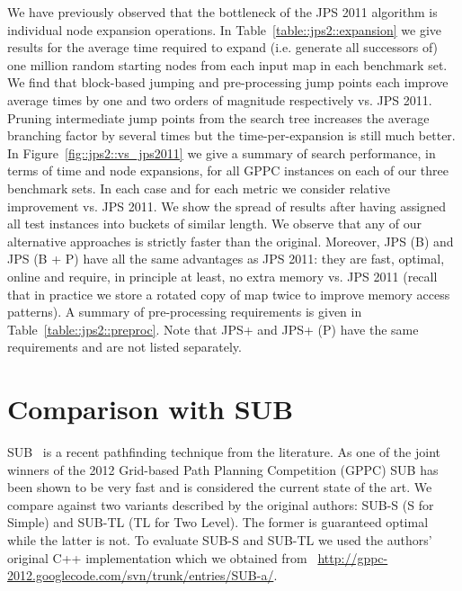 We have previously observed that the bottleneck of the JPS 2011 algorithm is
individual node expansion operations. In Table~\ref{table::jps2::expansion} we
give results for the average time required to expand (i.e. generate all
successors of) one million random starting nodes from each input map in each
benchmark set. We find that block-based jumping and pre-processing jump points
each improve average times by one and two orders of magnitude respectively vs.
JPS 2011.  Pruning intermediate jump points from the search tree increases the
average branching factor by several times but the time-per-expansion is still
much better.  In Figure~\ref{fig::jps2::vs_jps2011} we give a summary of
search performance, in terms of time and node expansions, for all GPPC
instances on each of our three benchmark sets.  In each case and for each
metric we consider relative improvement vs. JPS 2011.  We show the spread of
results after having assigned all test instances into buckets of similar
length.  We observe that any of our alternative approaches is strictly faster
than the original.  Moreover, JPS (B) and JPS (B + P) have all the same
advantages as JPS 2011: they are fast, optimal, online and require, in
principle at least, no extra memory vs. JPS 2011 (recall that in practice we
store a rotated copy of map twice to improve memory access patterns).  A
summary of pre-processing requirements is given in
Table~\ref{table::jps2::preproc}. Note that JPS+ and JPS+ (P) have the same
requirements and are not listed separately.



\section{Comparison with SUB}
SUB~\cite{urasKH13} is a recent pathfinding technique from the literature.
As one of the joint winners of the 2012 Grid-based Path Planning Competition (GPPC) 
SUB has been shown to be very fast and is considered the current state of the art.
We compare against two variants described by the original authors: SUB-S (S
for Simple) and SUB-TL (TL for Two Level). The former is guaranteed optimal
while the latter is not.  To evaluate SUB-S and SUB-TL we used the authors'
original C++ implementation which we obtained from~{\small
\url{http://gppc-2012.googlecode.com/svn/trunk/entries/SUB-a/}}.


